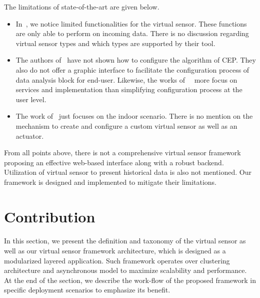 The limitations of state-of-the-art are given below.
\begin{itemize}
    \item In~\cite{al2013}, we notice limited functionalities for the virtual sensor. These functions are only able to perform on incoming data. There is no discussion regarding virtual sensor types and which types are supported by their tool.
    \item The authors of~\cite{JeongJooHongShinLee2015} have not shown how to configure the algorithm of CEP. They also do not offer a graphic interface to facilitate the configuration process of data analysis block for end-user. Likewise, the works of~\cite{Julien2014}~\cite{LHuFWangJZhouK2015} more focus on services and implementation than simplifying configuration process at the user level.
    \item The work of~\cite{BrunelliGalloBenini2016} just focuses on the indoor scenario. There is no mention on the mechanism to create and configure a custom virtual sensor as well as an actuator.
\end{itemize}
From all points above, there is not a comprehensive virtual sensor framework proposing an effective web-based interface along with a robust backend. Utilization of virtual sensor to present historical data is also not mentioned. Our framework is designed and implemented to mitigate their limitations.

\section{Contribution}
\paragraph{}In this section, we present the definition and taxonomy of the virtual sensor as well as our virtual sensor framework architecture, which is designed as a modularized layered application. Such framework operates over clustering architecture and asynchronous model to maximize scalability and performance. At the end of the section, we describe the work-flow of the proposed framework in specific deployment scenarios to emphasize its benefit.
